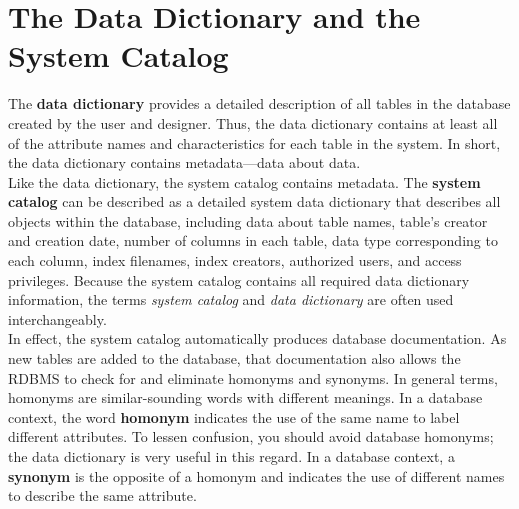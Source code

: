 \documentclass[a4paper, 12pt, titlepage]{report}
\begin{document}
{\section{The Data Dictionary and the System Catalog}
The \textbf{data dictionary} provides a detailed description of all tables in the database created by the user and designer. Thus, the data dictionary contains at least all of the attribute names and characteristics for each table in the system. In short, the data dictionary contains metadata—data about data.\\
Like the data dictionary, the system catalog contains metadata. The \textbf{system catalog} can be described as a detailed system data dictionary that describes all objects within the database, including data about table names, table’s creator and creation
date, number of columns in each table, data type corresponding to each column, index filenames, index creators, authorized users, and access privileges. Because the system catalog contains all required data dictionary information, the terms \emph{system catalog} and \emph{data dictionary} are often used interchangeably.\\
In effect, the system catalog automatically produces database documentation. As new tables are added to the database, that documentation also allows the RDBMS to check for and eliminate homonyms and synonyms. In general terms, homonyms are similar-sounding words with different meanings. In a database context, the word \textbf{homonym} indicates the use of the same name to label different attributes. To lessen confusion, you should avoid database homonyms; the data dictionary is very useful in this regard. In a database context, a \textbf{synonym} is the opposite of a homonym and indicates the use of different names to describe the same attribute.
}
\end{document}

